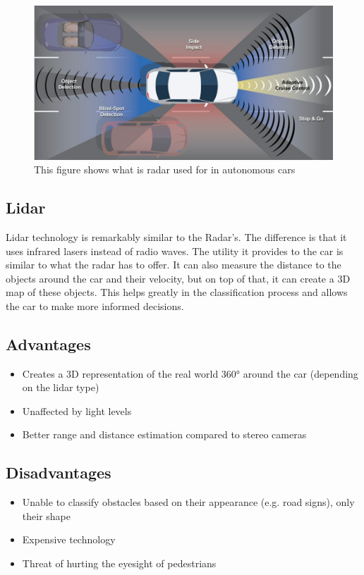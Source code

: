   \begin{figure}[H]
\centering
\includegraphics[width=\textwidth]{Figures/ConAnalysis/General/radar.jpg}
\caption{This figure shows what is radar used for in autonomous cars\cite{3m321F1j31:online}}
\end{figure}
\subsection{Lidar}
Lidar technology is remarkably similar to the Radar's. The difference is that it uses infrared lasers instead of radio waves. The utility it provides to the car is similar to what the radar has to offer. It can also measure the distance to the objects around the car and their velocity, but on top of that, it can create a 3D map of these objects. This helps greatly in the classification process and allows the car to make more informed decisions.\cite{Autonomo37:online}

\subsection*{Advantages}
\begin{itemize}
  \item Creates a 3D representation of the real world 360° around the car (depending on the lidar type)
  \item Unaffected by light levels
  \item Better range and distance estimation compared to stereo cameras
\end{itemize}
\subsection*{Disadvantages}
\begin{itemize}
  \item Unable to classify obstacles based on their appearance (e.g. road signs), only their shape
  \item Expensive technology 
  \item Threat of hurting the eyesight of pedestrians
\end{itemize}
 \cite{LidarRad25:online}
 
